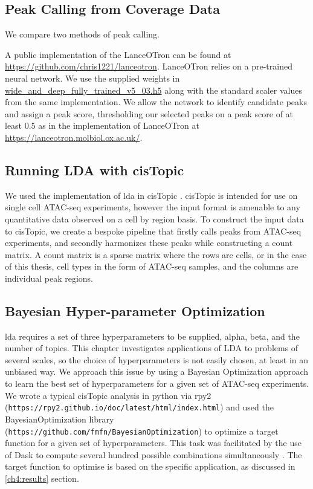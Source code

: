 \subsection{Peak Calling from Coverage Data} \label{ch4:method_peaks}

We compare two methods of peak calling.

A public implementation of the LanceOTron can be found at \url{https://github.com/chris1221/lanceotron}. LanceOTron relies on a pre-trained neural network. We use the supplied weights in \url{wide_and_deep_fully_trained_v5_03.h5} along with the standard scaler values from the same implementation. We allow the network to identify candidate peaks and assign a peak score, thresholding our selected peaks on a peak score of at least 0.5 as in the implementation of LanceOTron at \url{https://lanceotron.molbiol.ox.ac.uk/}.


\subsection{Running LDA with cisTopic} \label{ch4:method_cistopic}

We used the implementation of \gls{lda} in cisTopic \cite{BravoGonzalez-Blas2019}. cisTopic is intended for use on single cell ATAC-seq experiments, however the input format is amenable to any quantitative data observed on a cell by region basis. To construct the input data to cisTopic, we create a bespoke pipeline that firstly calls peaks from ATAC-seq experiments, and secondly harmonizes these peaks while constructing a count matrix. A count matrix is a sparse matrix where the rows are cells, or in the case of this thesis, cell types in the form of ATAC-seq samples, and the columns are individual peak regions.

\subsection{Bayesian Hyper-parameter Optimization} \label{ch4:hyper}

\gls{lda} requires a set of three hyperparameters to be supplied, alpha, beta, and the number of topics. This chapter investigates applications of LDA to problems of several scales, so the choice of hyperparameters is not easily chosen, at least in an unbiased way. We approach this issue by using a Bayesian Optimization approach to learn the best set of hyperparameters for a given set of ATAC-seq experiments. We wrote a typical cisTopic analysis in python via rpy2 ({\tt https://rpy2.github.io/doc/latest/html/index.html}) and used the BayesianOptimization library ({\tt https://github.com/fmfn/BayesianOptimization}) to optimize a target function for a given set of hyperparameters. This task was facilitated by the use of Dask to compute several hundred possible combinations simultaneously \cite{Rocklin2015}. The target function to optimise is based on the specific application, as discussed in \autoref{ch4:results} section.

